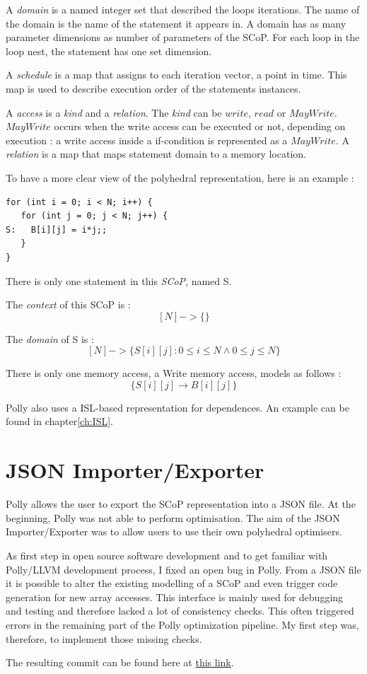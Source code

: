 A \emph{domain} is a named integer set that described the loops iterations. The name of the domain is the name of the statement it appears in. A domain has as many parameter dimensions as number of parameters of the SCoP. For each loop in the loop nest, the statement has one set dimension.

A \emph{schedule} is a map that assigns to each iteration vector, a point in time. This map is used to describe execution order of the statements instances.

A \emph{access} is a \emph{kind} and a \emph{relation}. The \emph{kind} can be $write$, $read$ or $MayWrite$. $MayWrite$ occurs when the write access can be executed or not, depending on execution : a write access inside a if-condition is represented as a $MayWrite$. A \emph{relation} is a map that maps statement domain to a memory location. 

To have a more clear view of the polyhedral representation, here is an example :
\begin{lstlisting}[frame=single]
for (int i = 0; i < N; i++) {
   for (int j = 0; j < N; j++) {
S:   B[i][j] = i*j;;
   }
}
\end{lstlisting}
There is only one statement in this \emph{SCoP}, named S.

The \emph{context} of this SCoP is :
\[
[N] -> \{ \}
\]

The \emph{domain} of S is :
\[
[N] -> \{ S[i][j] : 0\le i \le N \wedge 0\le j \le N \}
\]

There is only one memory access, a Write memory access, models as follows :
\[
\{ S[i][j] \rightarrow B[i][j] \}
\]

Polly also uses a ISL-based representation for dependences. An example can be found in chapter\ref{ch:ISL}.

\section{JSON Importer/Exporter}
Polly allows the user to export the SCoP representation into a JSON file. At the beginning, Polly was not able to perform optimisation. The aim of the JSON Importer/Exporter was to allow users to use their own polyhedral optimisers. 

As first step in open source software development and to get familiar with Polly/LLVM development process, I fixed an open bug in Polly. From a JSON file it is possible to alter the existing modelling of a SCoP and even trigger code generation for new array accesses. This interface is mainly used for debugging and testing and therefore lacked a lot of consistency checks. This often triggered errors in the remaining part of the Polly optimization pipeline. My first step was, therefore, to implement those missing checks.

The resulting commit can be found here at \href{https://reviews.llvm.org/D32739}{this link}.